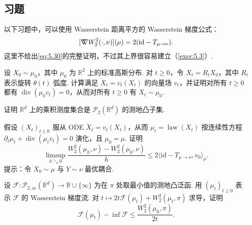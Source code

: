 \subsection{习题}\label{sec:5.10}

以下习题中，可以使用 Wasserstein 距离平方的 Wasserstein 梯度公式：
\begin{equation}\label{eq:5.30}
[\nabla\mkern-10mu\nabla W_2^2(\cdot,\nu)](\mu)=2(\mathrm{id}-T_{\mu\to\nu}).
\end{equation}
这里不给出\eqref{eq:5.30}的完整证明，不过其上界很容易建立（\autoref{exer:5.3}）.

\begin{exercise}\label{exer:5.1}
设 $X_0\sim\mu_0$，其中 $\mu_0$ 为 $\mathbb R^2$ 上的标准高斯分布. 对 $t\geq0$，令 $X_t=R_tX_0$，其中 $R_t$ 表示旋转 $\theta(t)$ 弧度. 计算满足 $\dot X_t=v_t(X_t)$ 的向量场 $v_t$，并证明对所有 $t\geq0$ 都有 $\operatorname{div}(\mu_0v_t)=0$，从而对所有 $t\geq0$ 有 $X_t\sim\mu_0$.
\end{exercise}

\begin{exercise}\label{exer:5.2}
证明 $\mathbb R^d$ 上的乘积测度集合是 $\mathcal P_2(\mathbb R^d)$ 的测地凸子集.
\end{exercise}

\begin{exercise}\label{exer:5.3}
假设 $(X_t)_{t\in\mathbb R}$ 服从 ODE $\dot X_t=v_t(X_t)$，从而 $\mu_t=\operatorname{law}(X_t)$ 按连续性方程 $\partial_t\mu_t+\operatorname{div}(\mu_tv_t)=0$ 演化，且 $\mu_0=\mu$. 证明
$$
\limsup_{h\searrow0}\frac{W_2^2(\mu_h,\nu)-W_2^2(\mu_0,\nu)}h
\leq2\langle\mathrm{id}-T_{\mu\to\nu},v_0\rangle_\mu.
$$
提示：令 $X_0\sim\mu$ 与 $Y\sim\nu$ 最优耦合.
\end{exercise}

\begin{exercise}\label{exer:5.4}
设 $\mathcal F:\mathcal P_{2,\mathrm{ac}}(\mathbb R^d)\to\mathbb R\cup\{\infty\}$ 为在 $\pi$ 处取最小值的测地凸泛函. 用 $(\mu_t)_{t\geq0}$ 表示 $\mathcal F$ 的 Wasserstein 梯度流. 对 $t\mapsto2t\mathcal F(\mu_t)+W_2^2(\mu_t,\pi)$ 求导，证明
$$
\mathcal F(\mu_t)-\inf\mathcal F\leq\frac{W_2^2(\mu_0,\pi)}{2t}.
$$
\end{exercise}

